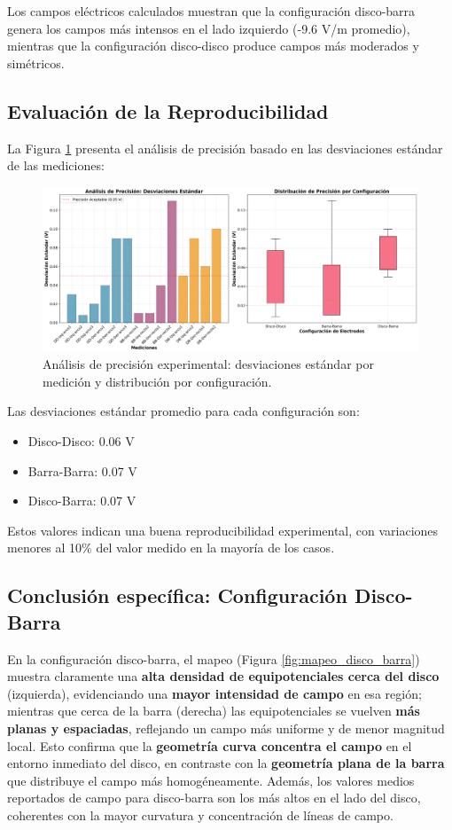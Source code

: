 \documentclass[11pt,twocolumn]{article}
\begin{document}
Los campos eléctricos calculados muestran que la configuración disco-barra genera los campos más intensos en el lado izquierdo (-9.6 V/m promedio), mientras que la configuración disco-disco produce campos más moderados y simétricos.

\subsection{Evaluación de la Reproducibilidad}

La Figura \ref{fig:precision} presenta el análisis de precisión basado en las desviaciones estándar de las mediciones:

\begin{figure}[h]
\centering
\includegraphics[width=0.9\columnwidth]{graficas/analisis_precision.png}
\caption{Análisis de precisión experimental: desviaciones estándar por medición y distribución por configuración.}
\label{fig:precision}
\end{figure}

Las desviaciones estándar promedio para cada configuración son:
\begin{itemize}
\item Disco-Disco: 0.06 V
\item Barra-Barra: 0.07 V  
\item Disco-Barra: 0.07 V
\end{itemize}

Estos valores indican una buena reproducibilidad experimental, con variaciones menores al 10\% del valor medido en la mayoría de los casos.

\subsection*{Conclusión específica: Configuración Disco-Barra}

En la configuración disco-barra, el mapeo (Figura \ref{fig:mapeo_disco_barra}) muestra claramente una \textbf{alta densidad de equipotenciales cerca del disco} (izquierda), evidenciando una \textbf{mayor intensidad de campo} en esa región; mientras que cerca de la barra (derecha) las equipotenciales se vuelven \textbf{más planas y espaciadas}, reflejando un campo más uniforme y de menor magnitud local. Esto confirma que la \textbf{geometría curva concentra el campo} en el entorno inmediato del disco, en contraste con la \textbf{geometría plana de la barra} que distribuye el campo más homogéneamente. Además, los valores medios reportados de campo para disco-barra son los más altos en el lado del disco, coherentes con la mayor curvatura y concentración de líneas de campo.
\end{document}
